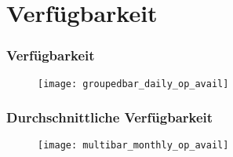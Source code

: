 \section{Verfügbarkeit}
\begin{frame}
    \frametitle{Verfügbarkeit}

    \begin{figure}
        \centering
        \texttt{[image: groupedbar\_daily\_op\_avail]}
    \end{figure}

\end{frame}

\begin{frame}
    \frametitle{Durchschnittliche Verfügbarkeit}

    \begin{figure}
        \centering
        \texttt{[image: multibar\_monthly\_op\_avail]}
    \end{figure}

\end{frame}